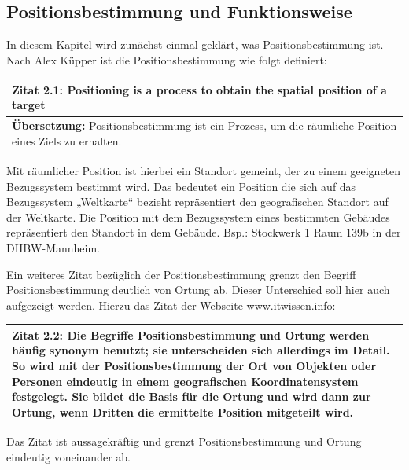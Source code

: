\newpage
\subsection{Positionsbestimmung und Funktionsweise}


In diesem Kapitel wird zunächst einmal geklärt, was Positionsbestimmung ist. 
Nach Alex Küpper ist die Positionsbestimmung wie folgt definiert:

\begin{table}[h]
	\centering
	\begin{tabular}{|p{16cm}|}\hline
		\textbf{Zitat 2.1:} \glqq Positioning is a process to obtain the spatial position of a target \grqq  \cite[S.121]{Kuepper2005} \\ \hline
		\textbf{Übersetzung:} Positionsbestimmung ist ein Prozess, um die räumliche Position eines Ziels zu erhalten. \\ \hline
	\end{tabular}
\end{table}

Mit räumlicher Position ist hierbei ein Standort gemeint, der zu einem geeigneten Bezugssystem bestimmt wird. Das bedeutet ein Position die sich auf das Bezugssystem „Weltkarte“ bezieht repräsentiert den geografischen Standort auf der Weltkarte. Die Position mit dem Bezugssystem eines bestimmten Gebäudes repräsentiert den Standort in dem Gebäude. Bsp.: Stockwerk 1 Raum 139b in der DHBW-Mannheim.

Ein weiteres Zitat bezüglich der Positionsbestimmung grenzt den Begriff Positionsbestimmung deutlich von Ortung ab. Dieser Unterschied soll hier auch aufgezeigt werden. Hierzu das Zitat der Webseite www.itwissen.info:

\begin{table}[h]
	\centering
	\begin{tabular}{|p{16cm}|}\hline
		\textbf{Zitat 2.2:} \glqq Die Begriffe Positionsbestimmung und Ortung werden häufig synonym benutzt; sie unterscheiden sich allerdings im Detail. So wird mit der Positionsbestimmung der Ort von Objekten oder Personen eindeutig in einem geografischen Koordinatensystem festgelegt. Sie bildet die Basis für die Ortung und wird dann zur Ortung, wenn Dritten die ermittelte Position mitgeteilt wird. \grqq  \cite[Positionsbestimmung]{itwissen} \\ \hline
	\end{tabular}
\end{table}

Das Zitat ist aussagekräftig und grenzt Positionsbestimmung und Ortung eindeutig voneinander ab.

